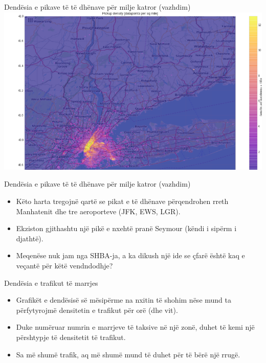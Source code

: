 \documentclass[
  ignorenonframetext,
]{beamer}
\begin{document}
\begin{frame}{Dendësia e pikave të të dhënave për milje katror
(vazhdim)}
\protect\hypertarget{denduxebsia-e-pikave-tuxeb-tuxeb-dhuxebnave-puxebr-milje-katror-vazhdim-3}{}
\includegraphics{./Figs/train18.png}
\end{frame}

\begin{frame}{Dendësia e pikave të të dhënave për milje katror
(vazhdim)}
\protect\hypertarget{denduxebsia-e-pikave-tuxeb-tuxeb-dhuxebnave-puxebr-milje-katror-vazhdim-4}{}
\begin{itemize}
\item
  Këto harta tregojnë qartë se pikat e të dhënave përqendrohen rreth
  Manhatenit dhe tre aeroporteve (JFK, EWS, LGR).
\item
  Ekziston gjithashtu një pikë e nxehtë pranë Seymour (këndi i sipërm i
  djathtë).
\item
  Meqenëse nuk jam nga SHBA-ja, a ka dikush një ide se çfarë është kaq e
  veçantë për këtë vendndodhje?
\end{itemize}
\end{frame}

\begin{frame}{Dendësia e trafikut të marrjes}
\protect\hypertarget{denduxebsia-e-trafikut-tuxeb-marrjes}{}
\begin{itemize}
\item
  Grafikët e dendësisë së mësipërme na nxitin të shohim nëse mund ta
  përfytyrojmë densitetin e trafikut për orë (dhe vit).
\item
  Duke numëruar numrin e marrjeve të taksive në një zonë, duhet të kemi
  një përshtypje të densitetit të trafikut.
\item
  Sa më shumë trafik, aq më shumë mund të duhet për të bërë një rrugë.
\end{itemize}
\end{frame}
\end{document}
